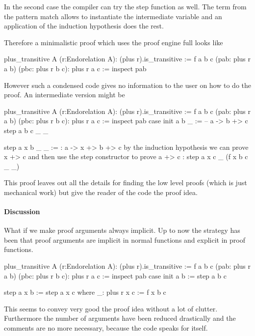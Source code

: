 In the second case the compiler can try the step function as well. The term
 from the pattern match allows to instantiate the intermediate
variable  and an application of the induction hypothesis does the
rest.

Therefore a minimalistic proof which uses the proof engine full looks like
%
\begin{alba}
  plus_transitive A (r:Endorelation A): (plus r).is_transitive :=
    f a b c (pab: plus r a b) (pbc: plus r b c): plus r a c :=
      inspect
        pab
\end{alba}
%
However such a condensed code gives no information to the user on how to do
the proof. An intermediate version might be
%
\begin{alba}
  plus_transitive A (r:Endorelation A): (plus r).is_transitive :=
    f a b c (pab: plus r a b) (pbc: plus r b c): plus r a c :=
      inspect
        pab
      case
        init a b _ :=
            -- a -> b +> c
          step a b c _ _

        step a x b _ _ :=
            {: a -> x +> b +> c
               by the induction hypothesis we can prove x +> c
               and then use the step constructor to prove a +> c :}
          step a x c _ (f x b c _ _)
\end{alba}
%
This proof leaves out all the details for finding the low level proofs (which
is just mechanical work) but give the reader of the code the proof idea.



\paragraph{Discussion} What if we make proof arguments always implicit. Up to
now the strategy has been that proof arguments are implicit in normal
functions and explicit in proof functions.

\begin{alba}
  plus_transitive A (r:Endorelation A): (plus r).is_transitive :=
    f a b c (pab: plus r a b) (pbc: plus r b c): plus r a c :=
      inspect
        pab
      case
        init a b :=
          step a b c

        step a x b :=
          step a x c
            where
              _: plus r x c :=  f x b c
\end{alba}
%
This seems to convey very good the proof idea without a lot of
clutter. Furthermore the number of arguments have been reduced drastically and
the comments are no more necessary, because the code speaks for itself.

